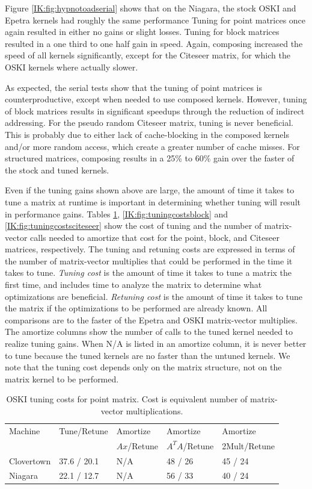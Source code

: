 Figure \ref{IK:fig:hypnotoadserial} shows that
on the Niagara, the stock OSKI and Epetra kernels had roughly the same performance
Tuning for point matrices once again resulted in either no gains or
slight losses. Tuning for block matrices resulted in a one third to one half gain in speed.  Again,
composing increased the speed of all kernels significantly, except for the Citeseer matrix, for which the
OSKI kernels where actually slower.

As expected, the serial tests show that the tuning of point matrices is counterproductive,
except when needed to use composed kernels.
However, tuning of block matrices results in significant speedups through the reduction of indirect addressing.  For the
pseudo random Citeseer matrix, tuning is never beneficial.  This is probably due to either lack of cache-blocking in the composed kernels
 and/or more random access, which create a greater number of cache misses.
For structured matrices, composing results in a 25\% to 60\% gain over the faster of the stock and tuned kernels.

Even if the tuning gains shown above are large, the amount of time it takes to tune a matrix at runtime is important in determining whether
tuning will result in performance gains.  Tables \ref{IK:fig:tuningcostspoint}, \ref{IK:fig:tuningcostsblock}
and \ref{IK:fig:tuningcostsciteseer} show the cost of tuning and the number of matrix-vector calls needed to amortize that cost for the point, block, and Citeseer matrices, respectively.
 The tuning and retuning costs are expressed in terms of 
the number of matrix-vector multiplies that could be performed in the time it takes to tune.
{\it Tuning cost} is the amount of time it takes to tune a matrix the first time, and includes
time to analyze the matrix to determine what optimizations are beneficial.
{\it Retuning cost} is the amount of time it takes to tune the matrix if the optimizations
to be performed are already known.  All comparisons are to the faster of the Epetra and OSKI matrix-vector
multiplies.  The amortize columns show the number of calls to the tuned kernel needed to realize
tuning gains.  When N/A is listed in an amortize column, it is never better to tune 
because the tuned kernels are no faster than the untuned kernels.
We note that the tuning cost depends only on the matrix structure, not on the matrix kernel to be
performed.
%
\begin{table}[htbp]
\centering
\begin{tabular}{|l|l|l|l|l|}
\hline
Machine & Tune/Retune & Amortize & Amortize & Amortize \\
 & & $Ax$/Retune & $A^TA$/Retune & 2Mult/Retune \\
\hline
Clovertown & 37.6 / 20.1 & N/A & 48 / 26 & 45 / 24 \\
Niagara & 22.1 / 12.7 & N/A & 56 / 33 & 40 / 24 \\
\hline
\end{tabular}
\caption{OSKI tuning costs for point matrix.  Cost is equivalent number of matrix-vector multiplications.} \label{IK:fig:tuningcostspoint}
\end{table}

